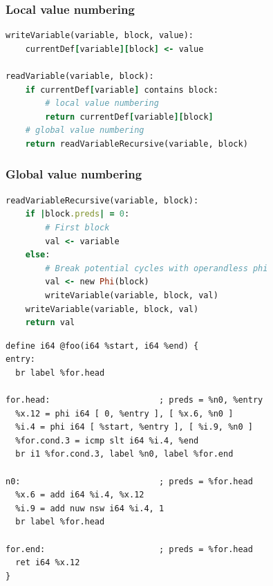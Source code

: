 \documentclass[14pt]{beamer}\beamertemplatenavigationsymbolsempty
\begin{document}
\begin{frame}[fragile]
\frametitle{Local value numbering}
\begin{lstlisting}[language=ruby]
writeVariable(variable, block, value):
    currentDef[variable][block] <- value

readVariable(variable, block):
    if currentDef[variable] contains block:
        # local value numbering
        return currentDef[variable][block]
    # global value numbering
    return readVariableRecursive(variable, block)
\end{lstlisting}
\end{frame}

\begin{frame}[fragile]
\frametitle{Global value numbering}
\begin{lstlisting}[language=ruby]
readVariableRecursive(variable, block):
    if |block.preds| = 0:
        # First block
        val <- variable
    else:
        # Break potential cycles with operandless phi
        val <- new Phi(block)
        writeVariable(variable, block, val)
    writeVariable(variable, block, val)
    return val
\end{lstlisting}
\end{frame}

\begin{frame}[fragile]
\begin{lstlisting}
define i64 @foo(i64 %start, i64 %end) {
entry:
  br label %for.head

for.head:                      ; preds = %n0, %entry
  %x.12 = phi i64 [ 0, %entry ], [ %x.6, %n0 ]
  %i.4 = phi i64 [ %start, %entry ], [ %i.9, %n0 ]
  %for.cond.3 = icmp slt i64 %i.4, %end
  br i1 %for.cond.3, label %n0, label %for.end

n0:                            ; preds = %for.head
  %x.6 = add i64 %i.4, %x.12
  %i.9 = add nuw nsw i64 %i.4, 1
  br label %for.head

for.end:                       ; preds = %for.head
  ret i64 %x.12
}
\end{lstlisting}
\end{frame}
\end{document}
